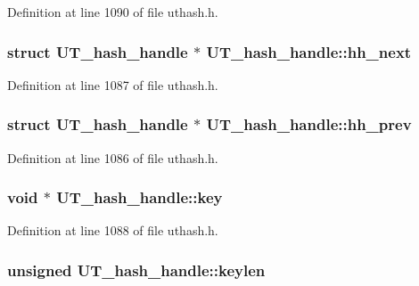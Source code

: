 Definition at line 1090 of file uthash.\-h.

\hypertarget{struct_u_t__hash__handle_a68446f17ac973f8e7e483ec3eca4891c}{
\subsubsection[{hh\-\_\-next}]{\setlength{\rightskip}{0pt plus 5cm}struct {\bf U\-T\-\_\-hash\-\_\-handle} $\ast$ U\-T\-\_\-hash\-\_\-handle\-::hh\-\_\-next}}\label{struct_u_t__hash__handle_a68446f17ac973f8e7e483ec3eca4891c}


Definition at line 1087 of file uthash.\-h.

\hypertarget{struct_u_t__hash__handle_a7426418517c3a1e93fe477e643f60e70}{
\subsubsection[{hh\-\_\-prev}]{\setlength{\rightskip}{0pt plus 5cm}struct {\bf U\-T\-\_\-hash\-\_\-handle} $\ast$ U\-T\-\_\-hash\-\_\-handle\-::hh\-\_\-prev}}\label{struct_u_t__hash__handle_a7426418517c3a1e93fe477e643f60e70}


Definition at line 1086 of file uthash.\-h.

\hypertarget{struct_u_t__hash__handle_a426a06699977756c3b26667ede8f7a2a}{
\subsubsection[{key}]{\setlength{\rightskip}{0pt plus 5cm}void $\ast$ U\-T\-\_\-hash\-\_\-handle\-::key}}\label{struct_u_t__hash__handle_a426a06699977756c3b26667ede8f7a2a}


Definition at line 1088 of file uthash.\-h.

\hypertarget{struct_u_t__hash__handle_af2abdc405972a6bbdee2ade2c0f346c4}{
\subsubsection[{keylen}]{\setlength{\rightskip}{0pt plus 5cm}unsigned U\-T\-\_\-hash\-\_\-handle\-::keylen}}\label{struct_u_t__hash__handle_af2abdc405972a6bbdee2ade2c0f346c4}


